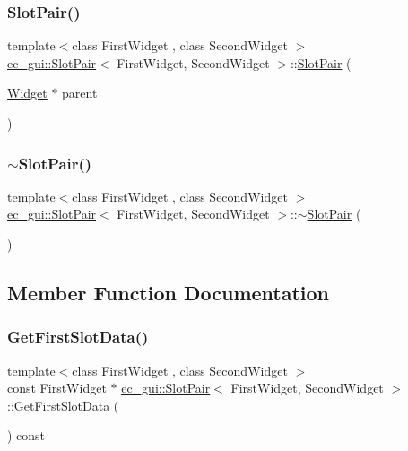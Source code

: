 \subsubsection{\texorpdfstring{Slot\+Pair()}{SlotPair()}}
{\footnotesize\ttfamily template$<$class First\+Widget , class Second\+Widget $>$ \\
\mbox{\hyperlink{classec__gui_1_1_slot_pair}{ec\+\_\+gui\+::\+Slot\+Pair}}$<$ First\+Widget, Second\+Widget $>$\+::\mbox{\hyperlink{classec__gui_1_1_slot_pair}{Slot\+Pair}} (\begin{DoxyParamCaption}\item[{\mbox{\hyperlink{classec__gui_1_1_widget}{Widget}} $\ast$}]{parent }\end{DoxyParamCaption})\hspace{0.3cm}{\ttfamily [explicit]}}

\mbox{\label{classec__gui_1_1_slot_pair_ac70eedc0a4e7c5ef1353746ae33c50d5}} 
\subsubsection{\texorpdfstring{$\sim$\+Slot\+Pair()}{~SlotPair()}}
{\footnotesize\ttfamily template$<$class First\+Widget , class Second\+Widget $>$ \\
\mbox{\hyperlink{classec__gui_1_1_slot_pair}{ec\+\_\+gui\+::\+Slot\+Pair}}$<$ First\+Widget, Second\+Widget $>$\+::$\sim$\mbox{\hyperlink{classec__gui_1_1_slot_pair}{Slot\+Pair}} (\begin{DoxyParamCaption}{ }\end{DoxyParamCaption})}



\subsection{Member Function Documentation}
\mbox{\label{classec__gui_1_1_slot_pair_a0b94f3971d74877a6b72094151a427db}} 
\subsubsection{\texorpdfstring{Get\+First\+Slot\+Data()}{GetFirstSlotData()}\hspace{0.1cm}{\footnotesize\ttfamily [1/2]}}
{\footnotesize\ttfamily template$<$class First\+Widget , class Second\+Widget $>$ \\
const First\+Widget $\ast$ \mbox{\hyperlink{classec__gui_1_1_slot_pair}{ec\+\_\+gui\+::\+Slot\+Pair}}$<$ First\+Widget, Second\+Widget $>$\+::Get\+First\+Slot\+Data (\begin{DoxyParamCaption}{ }\end{DoxyParamCaption}) const}

